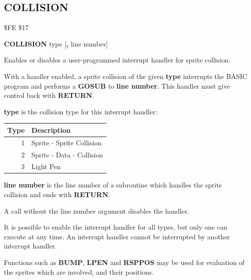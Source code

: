 \subsection{COLLISION}
\begin{description}[leftmargin=2cm,style=nextline]
\item [Token:]   \$FE \$17

\item [Format:]  {\bf COLLISION} type [{\bf,} line number]

\item [Usage:]   Enables or disables a user-programmed interrupt handler for sprite collision.

                 With a handler enabled, a sprite collision of the given {\bf type} interrupts the BASIC program and performs a {\bf GOSUB} to {\bf line number}. This handler must give control back with {\bf RETURN}.

                 {\bf type} is the collision type for this interrupt handler:
                 \begin{center}
                 \begin{tabular}{|r|l|}
                 \hline
                 {\bf Type} & {\bf Description}\\
                 \hline
                 1	& 	Sprite - Sprite Collision \\
                 2	& 	Sprite - Data - Collision \\
                 3	& 	Light Pen \\
                 \hline
                 \end{tabular}
                 \end{center}

                 {\bf line number} is the line number of a subroutine which handles the sprite collision and ends with {\bf RETURN}.

                 A call without the line number argument disables the handler.

\item [Remarks:] It is possible to enable the interrupt handler for all types, but only one can execute at any time. An interrupt handler cannot be interrupted by another interrupt handler.
               
                 Functions such as {\bf BUMP}, {\bf LPEN} and {\bf RSPPOS} may be used for evaluation of the sprites which are involved, and their positions.


\end{description}
